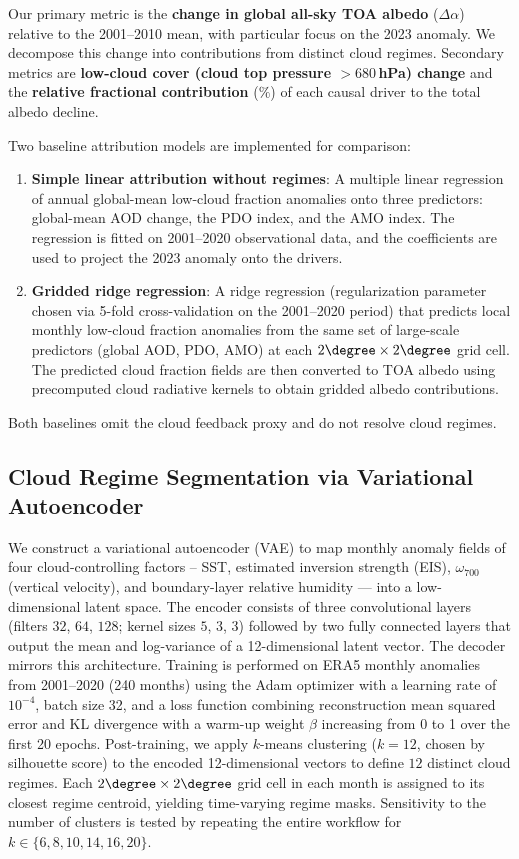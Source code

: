\documentclass{article}
\begin{document}
Our primary metric is the \textbf{change in global all-sky TOA albedo} ($\Delta\alpha$) relative to the 2001--2010 mean, with particular focus on the 2023 anomaly. We decompose this change into contributions from distinct cloud regimes. Secondary metrics are \textbf{low-cloud cover (cloud top pressure $>680$\,hPa) change} and the \textbf{relative fractional contribution} ($\%$) of each causal driver to the total albedo decline.

Two baseline attribution models are implemented for comparison:
\begin{enumerate}
    \item \textbf{Simple linear attribution without regimes}: A multiple linear regression of annual global-mean low-cloud fraction anomalies onto three predictors: global-mean AOD change, the PDO index, and the AMO index. The regression is fitted on 2001--2020 observational data, and the coefficients are used to project the 2023 anomaly onto the drivers.
    \item \textbf{Gridded ridge regression}: A ridge regression (regularization parameter chosen via 5-fold cross-validation on the 2001--2020 period) that predicts local monthly low-cloud fraction anomalies from the same set of large-scale predictors (global AOD, PDO, AMO) at each $2\degree \times 2\degree$ grid cell. The predicted cloud fraction fields are then converted to TOA albedo using precomputed cloud radiative kernels to obtain gridded albedo contributions.
\end{enumerate}
Both baselines omit the cloud feedback proxy and do not resolve cloud regimes.

\subsection{Cloud Regime Segmentation via Variational Autoencoder}

We construct a variational autoencoder (VAE) to map monthly anomaly fields of four cloud-controlling factors -- SST, estimated inversion strength (EIS), $\omega_{700}$ (vertical velocity), and boundary-layer relative humidity --- into a low-dimensional latent space. The encoder consists of three convolutional layers (filters $32$, $64$, $128$; kernel sizes $5$, $3$, $3$) followed by two fully connected layers that output the mean and log-variance of a 12-dimensional latent vector. The decoder mirrors this architecture. Training is performed on ERA5 monthly anomalies from 2001--2020 (240 months) using the Adam optimizer with a learning rate of $10^{-4}$, batch size 32, and a loss function combining reconstruction mean squared error and KL divergence with a warm-up weight $\beta$ increasing from 0 to 1 over the first 20 epochs. Post-training, we apply $k$-means clustering ($k=12$, chosen by silhouette score) to the encoded 12-dimensional vectors to define $12$ distinct cloud regimes. Each $2\degree\times2\degree$ grid cell in each month is assigned to its closest regime centroid, yielding time-varying regime masks. Sensitivity to the number of clusters is tested by repeating the entire workflow for $k \in \{6, 8, 10, 14, 16, 20\}$.
\end{document}
